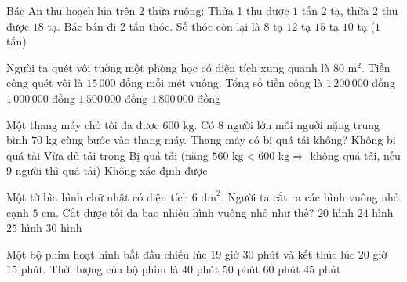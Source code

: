 \begin{ex} %
Bác An thu hoạch lúa trên 2 thửa ruộng: Thửa 1 thu được $1$ tấn $2$ tạ, thửa 2 thu được $18$ tạ. Bác bán đi $2$ tấn thóc. Số thóc còn lại là
\choice
{$8$ tạ}
{$12$ tạ}
{$15$ tạ}
{\True $10$ tạ ($1$ tấn)}
\end{ex}

\begin{ex} %
Người ta quét vôi tường một phòng học có diện tích xung quanh là $80\text{ m}^2$. Tiền công quét vôi là $15\,000$ đồng mỗi mét vuông. Tổng số tiền công là
\choice
{\True $1\,200\,000$ đồng}
{$1\,000\,000$ đồng}
{$1\,500\,000$ đồng}
{$1\,800\,000$ đồng}
\end{ex}

\begin{ex} %
Một thang máy chở tối đa được $600\text{ kg}$. Có $8$ người lớn mỗi người nặng trung bình $70\text{ kg}$ cùng bước vào thang máy. Thang máy có bị quá tải không?
\choice
{Không bị quá tải}
{Vừa đủ tải trọng}
{\True Bị quá tải (nặng $560\text{ kg} < 600\text{ kg} \Rightarrow$ không quá tải, nếu 9 người thì quá tải)}
{Không xác định được}
\end{ex}

\begin{ex} %
Một tờ bìa hình chữ nhật có diện tích $6\text{ dm}^2$. Người ta cắt ra các hình vuông nhỏ cạnh $5\text{ cm}$. Cắt được tối đa bao nhiêu hình vuông nhỏ như thế?
\choice
{$20$ hình}
{\True $24$ hình}
{$25$ hình}
{$30$ hình}
\end{ex}

\begin{ex} %
Một bộ phim hoạt hình bắt đầu chiếu lúc $19$ giờ $30$ phút và kết thúc lúc $20$ giờ $15$ phút. Thời lượng của bộ phim là
\choice
{$40$ phút}
{$50$ phút}
{$60$ phút}
{\True $45$ phút}
\end{ex}

